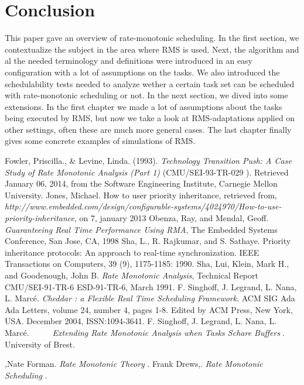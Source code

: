 \documentclass[a4paper,12pt]{article}
\theoremstyle{definition}
\begin{document}
\section{Conclusion}
This paper gave an overview of rate-monotonic scheduling. In the first section, we contextualize the subject in the area where RMS is used.
Next, the algorithm and al the needed terminology and definitions were
 introduced in an easy configuration with a lot of assumptions on the tasks. We 
 also introduced the schedulability tests needed to analyze wether a certain 
 task set can be scheduled with rate-monotonic scheduling or not. In the next section, 
 we dived into some extensions. In the first chapter we made a lot of 
 assumptions about the tasks being executed by RMS, but now we take a look at 
 RMS-adaptations applied on other settings, often these are much more general cases. The last chapter finally gives some concrete examples 
 of  simulations of RMS.
 \newpage
\begin{thebibliography}{99}
 Fowler, Priscilla., \& Levine, Linda. (1993). \emph{Technology Transition Push: A Case Study of Rate Monotonic Analysis (Part 1)} (CMU/SEI-93-TR-029 ). Retrieved January 06, 2014, from the Software Engineering Institute, Carnegie 
Mellon University.
 Jones, Michael. How to user priority inheritance, retrieved from, 
\textit{http://www.embedded.com/design/configurable-systems/4024970/How-to-use-priority-inheritance}, 
on 7, january 2013
 Obenza, Ray, and Mendal, Geoff. \textit{Guaranteeing Real Time Performance Using RMA}, The Embedded Systems Conference, San Jose, CA, 1998
 Sha, L., R. Rajkumar, and S. Sathaye. Priority inheritance protocols: An approach to real-time synchronization. IEEE Transactions on Computers, 39 (9), 1175-1185: 1990.
 Sha, Lui, Klein, Mark H., and Goodenough, John B. \textit{Rate Monotonic Analysis}, Technical Report CMU/SEI-91-TR-6 ESD-91-TR-6, March 1991.
F. Singhoff, J. Legrand, L. Nana, L. Marcé. \textit{Cheddar : a Flexible Real Time Scheduling Framework}. ACM SIG Ada Ada Letters, volume 24, number 4, pages 1-8. Edited by ACM Press, New York, USA. December 2004, ISSN:1094-3641.   
F. Singhoff, J. Legrand, L. Nana, L. Marcé. \textit{Extending Rate Monotonic Analysis when Tasks Schare Buffers}. University of Brest. 

,Nate Forman. \textit{Rate Monotonic Theory
}.
Frank Drews,. \textit{Rate Monotonic Scheduling
}.
   
   
 \end{thebibliography}
   
\end{document}
